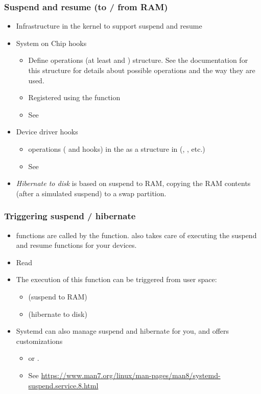 \begin{frame}
  \frametitle{Suspend and resume (to / from RAM)}
  \begin{itemize}
  \item Infrastructure in the kernel to support suspend and resume
  \item System on Chip hooks
    \begin{itemize}
    \item Define operations (at least  and )
       structure. See the documentation
      for this structure for details about possible operations and the
      way they are used.
    \item Registered using the  function
    \item See 
    \end{itemize}
  \item Device driver hooks
    \begin{itemize}
    \item {} operations ( and
       hooks) in the
       as a 
      structure in (, , etc.)
    \item See 
    \end{itemize}
   \item {\em Hibernate to disk} is based on suspend to RAM, copying
    the RAM contents (after a simulated suspend) to a swap partition.
  \end{itemize}
\end{frame}

\begin{frame}
  \frametitle{Triggering suspend / hibernate}
  \begin{itemize}
  \item {} functions are called by the
     function.  also
    takes care of executing the suspend and resume functions
    for your devices.
  \item Read 
  \item The execution of this function can be triggered from
    user space:
    \begin{itemize}
    \item {} (suspend to RAM)
    \item {} (hibernate to disk)
    \end{itemize}
  \item Systemd can also manage suspend and hibernate for you, and
        offers customizations
    \begin{itemize}
       \item {} or .
       \item \small See \url{https://www.man7.org/linux/man-pages/man8/systemd-suspend.service.8.html}
    \end{itemize}
  \end{itemize}
\end{frame}

